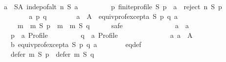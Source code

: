 \begin{isabellebody}
\ \ \ \ \ \ {\isacharparenleft}{\kern0pt}{\isasymforall}a\ {\isasymin}\ S{\isacharminus}{\kern0pt}A{\isachardot}{\kern0pt}\ indep{\isacharunderscore}{\kern0pt}of{\isacharunderscore}{\kern0pt}alt\ n\ S\ a\ {\isasymand}\isanewline
\ \ \ \ \ \ \ \ {\isacharparenleft}{\kern0pt}{\isasymforall}p{\isachardot}{\kern0pt}\ finite{\isacharunderscore}{\kern0pt}profile\ S\ p\ {\isasymlongrightarrow}\ a\ {\isasymin}\ reject\ n\ S\ p{\isacharparenright}{\kern0pt}{\isacharparenright}{\kern0pt}{\isachardoublequoteclose}\isanewline
\ \ \isamarkupfalse%
\isanewline
\ \ \ \ \isamarkupfalse%
\isanewline
\ \ \ \ \ \ {\isachardoublequoteopen}{\isasymforall}a\ p\ q{\isachardot}{\kern0pt}\isanewline
\ \ \ \ \ \ \ \ a\ {\isasymin}\ A\ {\isasymand}\ equiv{\isacharunderscore}{\kern0pt}prof{\isacharunderscore}{\kern0pt}except{\isacharunderscore}{\kern0pt}a\ S\ p\ q\ a\ {\isasymlongrightarrow}\isanewline
\ \ \ \ \ \ \ \ \ \ {\isacharparenleft}{\kern0pt}m\ {\isasymtriangleright}\ m{}{\isacharparenright}{\kern0pt}\ S\ p\ {\isacharequal}{\kern0pt}\ {\isacharparenleft}{\kern0pt}m\ {\isasymtriangleright}\ m{}{\isacharparenright}{\kern0pt}\ S\ q{\isachardoublequoteclose}\isanewline
\ \ \ \ \isamarkupfalse%
\ {\isacharparenleft}{\kern0pt}safe{\isacharparenright}{\kern0pt}\isanewline
\ \ \ \ \ \ \isamarkupfalse%
\isanewline
\ \ \ \ \ \ \ \ a\ {\isacharcolon}{\kern0pt}{\isacharcolon}{\kern0pt}\ {\isachardoublequoteopen}{\isacharprime}{\kern0pt}a{\isachardoublequoteclose}\ \isanewline
\ \ \ \ \ \ \ \ p\ {\isacharcolon}{\kern0pt}{\isacharcolon}{\kern0pt}\ {\isachardoublequoteopen}{\isacharprime}{\kern0pt}a\ Profile{\isachardoublequoteclose}\ \isanewline
\ \ \ \ \ \ \ \ q\ {\isacharcolon}{\kern0pt}{\isacharcolon}{\kern0pt}\ {\isachardoublequoteopen}{\isacharprime}{\kern0pt}a\ Profile{\isachardoublequoteclose}\isanewline
\ \ \ \ \ \ \isamarkupfalse%
\isanewline
\ \ \ \ \ \ \ \ a{\isacharcolon}{\kern0pt}\ {\isachardoublequoteopen}a\ {\isasymin}\ A{\isachardoublequoteclose}\ \isanewline
\ \ \ \ \ \ \ \ b{\isacharcolon}{\kern0pt}\ {\isachardoublequoteopen}equiv{\isacharunderscore}{\kern0pt}prof{\isacharunderscore}{\kern0pt}except{\isacharunderscore}{\kern0pt}a\ S\ p\ q\ a{\isachardoublequoteclose}\isanewline
\ \ \ \ \ \ \isamarkupfalse%
\ eq{\isacharunderscore}{\kern0pt}def{\isacharcolon}{\kern0pt}\isanewline
\ \ \ \ \ \ \ \ {\isachardoublequoteopen}defer\ m\ S\ p\ {\isacharequal}{\kern0pt}\ defer\ m\ S\ q{\isachardoublequoteclose}\isanewline

\end{isabellebody}
